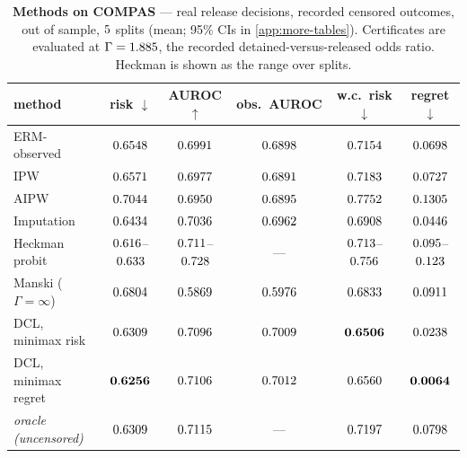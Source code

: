 \begin{table}[h]
\centering\small
\caption{\textbf{Methods on COMPAS} --- real release decisions, recorded
censored outcomes, out of sample, $5$ splits (mean; 95\% CIs in
\cref{app:more-tables}). Certificates are evaluated at $\Gamma=1.885$,
the recorded detained-versus-released odds ratio. Heckman is shown as the
range over splits.}
\label{tab:compas}
\begin{tabular}{lccccc}
\toprule
method & risk $\downarrow$ & AUROC $\uparrow$ & obs.\ AUROC & w.c.\ risk $\downarrow$ & regret $\downarrow$\\
\midrule
ERM-observed  & $0.6548$ & $0.6991$ & $0.6898$ & $0.7154$ & $0.0698$\\
IPW           & $0.6571$ & $0.6977$ & $0.6891$ & $0.7183$ & $0.0727$\\
AIPW          & $0.7044$ & $0.6950$ & $0.6895$ & $0.7752$ & $0.1305$\\
Imputation    & $0.6434$ & $0.7036$ & $0.6962$ & $0.6908$ & $0.0446$\\
Heckman probit & $0.616$--$0.633$ & $0.711$--$0.728$ & --- & $0.713$--$0.756$ & $0.095$--$0.123$\\
Manski ($\Gamma=\infty$) & $0.6804$ & $0.5869$ & $0.5976$ & $0.6833$ & $0.0911$\\
DCL, minimax risk   & $0.6309$ & $0.7096$ & $0.7009$ & $\mathbf{0.6506}$ & $0.0238$\\
DCL, minimax regret & $\mathbf{0.6256}$ & $0.7106$ & $0.7012$ & $0.6560$ & $\mathbf{0.0064}$\\
\emph{oracle (uncensored)} & \emph{$0.6309$} & \emph{$0.7115$} & --- & \emph{$0.7197$} & \emph{$0.0798$}\\
\bottomrule
\end{tabular}
\end{table}

